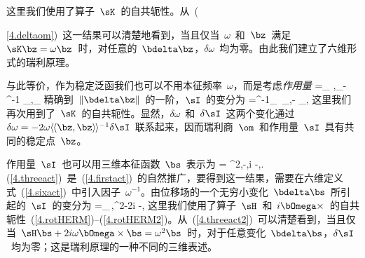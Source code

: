这里我们使用了算子~$\sK$~的自共轭性。从~({\ref{4.deltaom})~这一结果可以清楚地看到，当且仅当~$\omega$~和~$\bz$~满足~$\sK\bz=\omega\bz$~时，对任意的~$\bdelta\bz$，$\delta\omega$~均为零。由此我们建立了六维形式的瑞利原理。

与此等价，作为稳定泛函我们也可以不用本征频率~$\omega$，而是考虑{\em 作用量}
%
\eq
\label{4.sixact}
\sI=\half\langle_{\!}\langle
\bz,\bz\rangle_{\!}\rangle-\half\omega^{-1}
\langle_{\!}\langle\bz,\sK\bz\rangle_{\!}\rangle
\en
精确到~$\|\bdelta\bz\|$~的一阶，$\sI$~的变分为
\eq
\delta\sI=\omega^{-1}_{\,}
\langle_{\!}\langle\bdelta\bz,\omega\bz-\sK\bz
\rangle_{\!}\rangle,
\en
这里我们再次用到了~$\sK$~的自共轭性。显然，$\delta\omega$~和~$\delta \sI$~这两个变化通过~$\delta\omega=-2\omega\langle_{\!}\langle\bz,\bz\rangle_{\!}\rangle^{-1}\delta\sI$~联系起来，因而瑞利商~$\om$~和作用量~$\sI$~具有共同的稳定点~$\bz$。

作用量~$\sI$~也可以用三维本征函数~$\bs$~表示为
\eq
\label{4.threeact}
\sI=\half
\omega^2\langle\bs,\bs\rangle-\omega\langle\bs,i\bOmega\times\bs\rangle
-\half\langle\bs,\sH\bs\rangle.
\en
(\ref{4.threeact})~是~(\ref{4.firstact})~的自然推广，要得到这一结果，需要在六维定义式~(\ref{4.sixact})~中引入因子~$\omega^{-1}$。由位移场的一个无穷小变化~$\bdelta\bs$~所引起的~$\sI$~的变分为
\eq
\label{4.threeact2}
\delta\sI=_{\,}\langle\bdelta\bs,\omega^2\bs-2i\omega\bOmega
\times\bs-\sH\bs\rangle,
\en
这里我们使用了算子~$\sH$~和~$i\bOmega\times$~的自共轭性~(\ref{4.rotHERM})--(\ref{4.rotHERM2})。从~(\ref{4.threeact2})~可以清楚看到，当且仅当~$\sH\bs+2i\omega\bOmega\times\bs=\omega^2\bs$~时，对于任意变化~$\bdelta\bs$，$\delta\sI$~均为零；这是瑞利原理的一种不同的三维表述。

}
